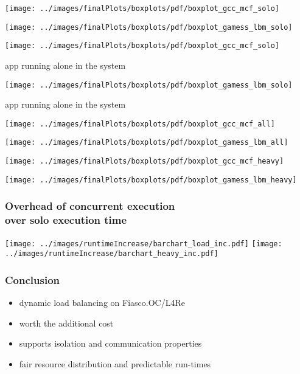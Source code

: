 \documentclass[utf8,10pt,aspectratio=169]{beamer}
\begin{document}
\begin{frame}
  \centering
    \texttt{[image: ../images/finalPlots/boxplots/pdf/boxplot\_gcc\_mcf\_solo]}

    \texttt{[image: ../images/finalPlots/boxplots/pdf/boxplot\_gamess\_lbm\_solo]}
\end{frame}

\begin{frame}
  \centering
    \texttt{[image: ../images/finalPlots/boxplots/pdf/boxplot\_gcc\_mcf\_solo]}

    \small
    app running alone in the system
\end{frame}

\begin{frame}
  \centering
    \texttt{[image: ../images/finalPlots/boxplots/pdf/boxplot\_gamess\_lbm\_solo]}

    \small
    app running alone in the system
\end{frame}


\begin{frame}
  \centering
    \texttt{[image: ../images/finalPlots/boxplots/pdf/boxplot\_gcc\_mcf\_all]}

    \texttt{[image: ../images/finalPlots/boxplots/pdf/boxplot\_gamess\_lbm\_all]}
\end{frame}


\begin{frame}
  \centering
    \texttt{[image: ../images/finalPlots/boxplots/pdf/boxplot\_gcc\_mcf\_heavy]}

    \texttt{[image: ../images/finalPlots/boxplots/pdf/boxplot\_gamess\_lbm\_heavy]}
\end{frame}

\begin{frame}
  \frametitle{Overhead of concurrent execution\\ over solo execution time}
  \centering
    \texttt{[image: ../images/runtimeIncrease/barchart\_load\_inc.pdf]}
    \texttt{[image: ../images/runtimeIncrease/barchart\_heavy\_inc.pdf]}
\end{frame}


\begin{frame}
  \frametitle{Conclusion}
  \centering
  \begin{itemize}
  \setlength{\itemsep}{6pt}
    \item dynamic load balancing on Fiasco.OC/L4Re
    \item worth the additional cost
    \item supports isolation and communication properties
    \item fair resource distribution and predictable run-times
  \end{itemize}
\end{frame}
\end{document}
